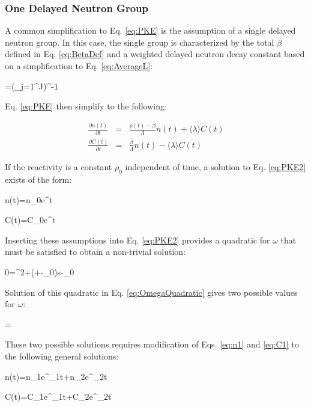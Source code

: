 \subsubsection{One Delayed Neutron Group}
\label{sec:OneDelayedGroup}
A common simplification to Eq. \eqref{eq:PKE} is the assumption of a single delayed neutron group. In this case, the single group is characterized by the total \(\beta\) defined in Eq. \eqref{eq:BetaDef} and a weighted delayed neutron decay constant based on a simplification to Eq. \eqref{eq:AverageL}:

\beq
\langle\lambda\rangle=\left(\sum_{j=1}^J\right)^{-1}
\eeq

Eq. \eqref{eq:PKE} then simplify to the following:

\begin{subequations}
\label{eq:PKE2}
\begin{eqnarray}
\frac{\partial n(t)}{\partial t}&=&\frac{\rho(t)-\beta}{\Lambda}n(t)+\langle\lambda\rangle C(t)\\
\frac{\partial C(t)}{\partial t}&=&\frac{\beta}{\Lambda}n(t)-\langle\lambda\rangle C(t)
\end{eqnarray}
\end{subequations}

If the reactivity is a constant \(\rho_0\) independent of time, a solution to Eq. \eqref{eq:PKE2} exists of the form:

\beq
\label{eq:n1}
n(t)=n_0e^{\omega t}
\eeq

\beq
\label{eq:C1}
C(t)=C_0e^{\omega t}
\eeq

Inserting these assumptions into Eq. \eqref{eq:PKE2} provides a quadratic for \(\omega\) that must be satisfied to obtain a non-trivial solution:

\beq
\label{eq:OmegaQuadratic}
0=\Lambda\omega^2+\left(\lambda\Lambda+\beta-\rho_0\right)s-\rho_0\lambda
\eeq

Solution of this quadratic in Eq. \eqref{eq:OmegaQuadratic} gives two possible values for \(\omega\):

\beq
\omega=
\eeq

These two possible solutions requires modification of Eqs. \eqref{eq:n1} and \eqref{eq:C1} to the following general solutions:

\beq
\label{eq:n2}
n(t)=n_1e^{\omega_1t}+n_2e^{\omega_2t}
\eeq

\beq
\label{eq:C2}
C(t)=C_1e^{\omega_1t}+C_2e^{\omega_2t}
\eeq

